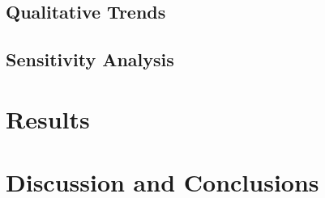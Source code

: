 \documentclass{article}
\providecommand{\printnomenclature}{\printglossary}
\begin{document}
\printglossary[type=main]

\printnomenclature{}











\subsection{Qualitative Trends}
\subsection{Sensitivity Analysis}

\section{Results}
\subsection{}

\section{Discussion and Conclusions}



\end{document}
